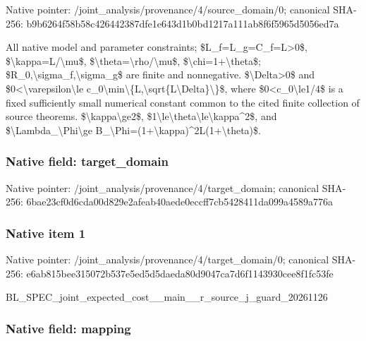 \documentclass[10pt,a4paper]{article}
\begin{document}
Native pointer: /joint\_analysis/provenan\allowbreak{}ce/4/source\_domain/0; canonical SHA-256: b9b6264f58b58c426442387d\allowbreak{}fe1e643d1b0bd1217a111ab8\allowbreak{}f6f5965d5056ed7a


All native model and parameter constraints; \$L\_f=L\_g=C\_f=L>0\$, \$\textbackslash{}kappa=L/\textbackslash{}mu\$, \$\textbackslash{}theta=\textbackslash{}rho/\textbackslash{}mu\$, \$\textbackslash{}chi=1+\textbackslash{}theta\$; \$R\_0,\textbackslash{}sigma\_f,\textbackslash{}sigma\_g\$ are finite and nonnegative. \$\textbackslash{}Delta>0\$ and \$0<\textbackslash{}varepsilon\textbackslash{}le c\_0\textbackslash{}min\textbackslash{}\{L,\textbackslash{}sqrt\{L\textbackslash{}Delta\}\textbackslash{}\}\$, where \$0<c\_0\textbackslash{}le1/4\$ is a fixed sufficiently small numerical constant common to the cited finite collection of source theorems. \$\textbackslash{}kappa\textbackslash{}ge2\$, \$1\textbackslash{}le\textbackslash{}theta\textbackslash{}le\textbackslash{}kappa\textasciicircum{}2\$, and \$\textbackslash{}Lambda\_\textbackslash{}Phi\textbackslash{}ge B\_\textbackslash{}Phi=(1+\textbackslash{}kappa)\textasciicircum{}2L(1+\textbackslash{}theta)\$.


\subsubsection{Native field: target\_domain}


Native pointer: /joint\_analysis/provenan\allowbreak{}ce/4/target\_domain; canonical SHA-256: 6bae23cf0d6cda00d829e2af\allowbreak{}eab40aede0eccff7cb542841\allowbreak{}1da099a4589a776a



\subsubsection{Native item 1}


Native pointer: /joint\_analysis/provenan\allowbreak{}ce/4/target\_domain/0; canonical SHA-256: e6ab815bee315072b537e5ed\allowbreak{}5d5daeda80d9047ca7d6f114\allowbreak{}3930cee8f1fc53fe


BL\_SPEC\_joint\_expected\_c\allowbreak{}ost\_\_main\_\_r\_source\_j\_gu\allowbreak{}ard\_20261126


\subsubsection{Native field: mapping}
\end{document}
